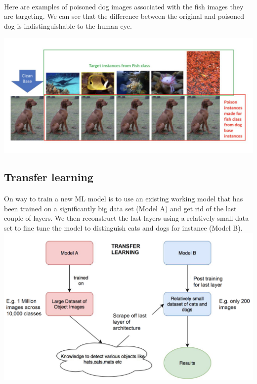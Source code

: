 \documentclass[twoside]{article}
\begin{document}
\paragraph{}
Here are examples of poisoned dog images associated with the fish images they are targeting. We can see that the difference between the original and poisoned dog is indistinguishable to the human eye.   

\includegraphics[scale=0.4]{ExamplePoisoning2.png}

\subsection{Transfer learning}
\paragraph{}
On way to train a new ML model is to use an existing working model that has been trained on a significantly big data set (Model A) and get rid of the last couple of layers. We then reconstruct the last layers using a relatively small data set to fine tune the model to distinguish cats and dogs for instance (Model B). 
\includegraphics[scale=0.3]{MLTransfer.png}
\end{document}
